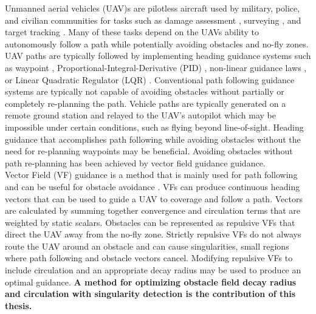 \documentclass[numbered,pdftex]{ohio-etd}
\begin{document}
Unmanned aerial vehicles (UAV)s are pilotless aircraft used by military, police, and civilian communities for tasks such as damage assessment \cite{fernandez_galarreta_uav-based_2015}, surveying \cite{remondino_uav_2012}, and target tracking \cite{ariyur_autonomous_2008,teuliere_chasing_2011,frew_cooperative_2007,oh_coordinated_2013,hyondong_oh_coordinated_2015,oliveira_moving_2016}. Many of these tasks depend on the UAVs ability to autonomously follow a path while potentially avoiding obstacles and no-fly zones. UAV paths are typically followed by implementing heading guidance systems such as waypoint \cite{osborne_waypoint_2005}, Proportional-Integral-Derivative (PID) \cite{rhee2010tight}, non-linear guidance laws \cite{park2007performance}, or Linear Quadratic Regulator (LQR) \cite{ratnoo_adaptive_2011}. Conventional path following guidance systems are typically not capable of avoiding obstacles without partially or completely re-planning the path. Vehicle paths are typically generated on a remote ground station and relayed to the UAV’s autopilot which may be impossible under certain conditions, such as flying beyond line-of-sight. Heading guidance that accomplishes path following while avoiding obstacles without the need for re-planning waypoints may be beneficial. Avoiding obstacles without path re-planning has been achieved by vector field guidance \cite{frew_cooperative_2007,griffiths_vector_2006,goncalves_artificial_2009,goncalves_circulation_2010,goncalves_vector_2010} guidance.\\

 

Vector Field (VF) guidance is a method that is mainly used for path following \cite{nelson_cooperative_2005,nelson_vector_2006,nelson_vector_2007,griffiths_vector_2006,goncalves_artificial_2009,goncalves_circulation_2010,goncalves_vector_2010} and can be useful for obstacle avoidance \cite{panagou_motion_2014,wilhelm_2019}. VFs can produce continuous heading vectors that can be used to guide a UAV to coverage and follow a path. Vectors are calculated by summing together convergence and circulation terms that are weighted by static scalars. Obstacles can be represented as repulsive VFs that direct the UAV away from the no-fly zone. Strictly repulsive VFs do not always route the UAV around an obstacle and can cause singularities, small regions where path following and obstacle vectors cancel. Modifying repulsive VFs to include circulation and an appropriate decay radius may be used to produce an optimal guidance. \textbf{A method for optimizing obstacle field decay radius and circulation with singularity detection is the contribution of this thesis.}
 \pagebreak
 
\end{document}
